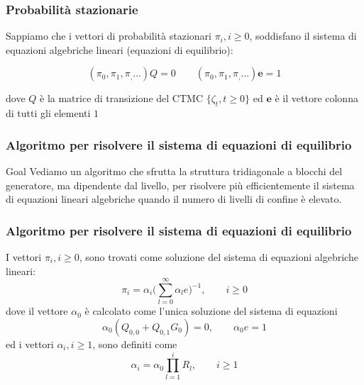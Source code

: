 \documentclass{beamer}
\begin{document}
\begin{frame}
    \frametitle{Probabilità stazionarie}
    Sappiamo che i vettori di probabilità stazionari $\pi_i, i \geq 0$, soddisfano il sistema di equazioni algebriche lineari (equazioni di equilibrio):
    \begin{block}{}
        $$(\pi_0, \pi_1, \pi_, \dots)Q = 0 \qquad (\pi_0, \pi_1, \pi_, \dots)\textbf{e} = 1$$
    \end{block}
    dove $Q$ è la matrice di transizione del CTMC $\{\zeta_t, t \geq 0\}$ ed $\textbf{e}$ è il vettore colonna di tutti gli elementi $1$
\end{frame}


\begin{frame}
    \frametitle{Algoritmo per risolvere il sistema di equazioni di equilibrio}
    \begin{block}{Goal}
            Vediamo un algoritmo che sfrutta la struttura tridiagonale a blocchi del generatore, ma dipendente dal livello, per risolvere più efficientemente il sistema di equazioni lineari algebriche quando il numero di livelli di confine è elevato.
    \end{block}
\end{frame}


\begin{frame}
    \frametitle{Algoritmo per risolvere il sistema di equazioni di equilibrio}
    \begin{theorem}
        I vettori $\pi_i, i \geq 0$, sono trovati come soluzione del sistema di equazioni algebriche lineari:
        \small{\begin{equation*}
            \pi_i = \alpha_i \big( \sum_{l=0}^\infty \alpha_l e \big)^{-1}, \qquad i \geq 0
        \end{equation*}}
        dove il vettore $\alpha_0$ è calcolato come l'unica soluzione del sistema di equazioni
        \small{\begin{equation*}
            \alpha_0(Q_{0,0} + Q_{0,1}G_0) = 0, \qquad \alpha_0e = 1
        \end{equation*}}
        ed i vettori $\alpha_i, i \geq 1$, sono definiti come
        \small{\begin{equation*}
            \alpha_i = \alpha_0 \prod_{l=1}^i R_l, \qquad i \geq 1
        \end{equation*}}
    \end{theorem}
\end{frame}
\end{document}
